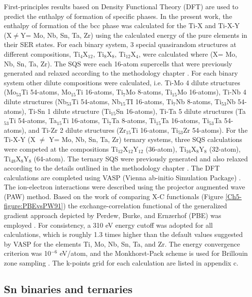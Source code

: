 First-principles results based on Density Functional Theory (DFT) are used to predict the enthalpy of formation of specific phases. In the present work, the enthalpy of formation of the bcc phase was calculated for the Ti-X and Ti-X-Y (X$\neq$Y= Mo, Nb, Sn, Ta, Zr) using the calculated energy of the pure elements in their SER states. For each binary system, 3 special quasirandom structures at different compositions, Ti$_4$X$_{12}$, Ti$_{8}$X$_{8}$, Ti$_{12}$X$_{4}$, were calculated where (X= Mo, Nb, Sn, Ta, Zr). The SQS were each 16-atom supercells that were previously generated and relaxed according to the methodology chapter \cite{Jiang2004}. For each binary system other dilute compositions were calculated, i.e. Ti-Mo 4 dilute structures (Mo$_{53}$Ti 54-atoms, Mo$_{15}$Ti 16-atoms,  Ti$_{7}$Mo 8-atoms, Ti$_{15}$Mo 16-atoms), Ti-Nb 4 dilute structures (Nb$_{53}$Ti 54-atoms, Nb$_{15}$TI 16-atoms, Ti$_{7}$Nb 8-atoms, Ti$_{53}$Nb 54-atoms), Ti-Sn 1 dilute structure (Ti$_{15}$Sn 16-atoms), Ti-Ta 5 dilute structures (Ta$_{53}$Ti 54-atoms, Ta$_{15}$Ti 16-atoms, Ti$_{7}$Ta 8-atoms, Ti$_{15}$Ta 16-atoms, Ti$_{53}$Ta 54-atoms), and Ti-Zr 2 dilute structures (Zr$_{15}$Ti 16-atoms, Ti$_{53}$Zr 54-atoms). For the Ti-X-Y (X $\neq$ Y= Mo, Nb, Sn, Ta, Zr) ternary systems, three SQS calculations were competed at the compositions Ti$_{12}$X$_{12}$Y$_{12}$ (36-atom), Ti$_{16}$X$_{8}$Y$_{8}$ (32-atom), Ti$_{48}$X$_{8}$Y$_{8}$ (64-atom). The ternary SQS were previously generated and also relaxed according to the details outlined in the methodology chapter \cite{Jiang2009}. The DFT calculations are completed using VASP (Vienna ab-initio Simulation Package) \cite{Kresse1996}. The ion-electron interactions were described using the projector augmented wave (PAW) \cite{Kresse1999,Blochl1994} method. Based on the work of comparing X-C functionals (Figure \ref{Ch5-figure:PBEvsPW91}) the exchange-correlation functional of the generalized gradient approach depicted by Perdew, Burke, and Ernzerhof (PBE) was employed \cite{Perdew1996a}. For consistency, a 310 eV energy cutoff was adopted for all calculations, which is roughly 1.3 times higher than the default values suggested by VASP for the elements Ti, Mo, Nb, Sn, Ta, and Zr. The energy convergence criterion was 10$^{-6}$ eV/atom, and the Monkhorst-Pack scheme is used for Brillouin zone sampling \cite{Kresse1996,Monkhorst1976a}. The k-points grid for each calculation are listed in appendix c.

\subsection{Sn binaries and ternaries}

